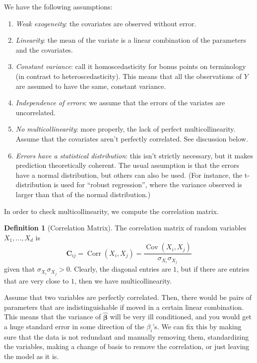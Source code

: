 \documentclass{article}
\DeclareMathOperator{\Cov}{Cov}
\DeclareMathOperator{\Corr}{Corr}
\theoremstyle{definition}
\newtheorem{definition}{Definition}[section]
\begin{document}
  We have the following assumptions: 
  \begin{enumerate}
    \item \textit{Weak exogeneity}: the covariates are observed without error.
    \item \textit{Linearity}: the mean of the variate is a linear combination of the parameters and the covariates.
    \item \textit{Constant variance}: call it homoscedasticity for bonus points on terminology (in contrast to heteroscedasticity).
    This means that all the observations of $Y$ are assumed to have the same, constant variance.
    \item \textit{Independence of errors}: we assume that the errors of the variates are uncorrelated.
    \item \textit{No multicollinearity}: more properly, the lack of perfect multicollinearity. Assume that the covariates aren't perfectly correlated. See discussion below.
    \item \textit{Errors have a statistical distribution}: this isn't strictly necessary, but it makes prediction theoretically coherent. The usual assumption is that the errors have a normal distribution, but others can also be used.
    (For instance, the t-distribution is used for ``robust regression'', where the variance observed is larger than that of the normal distribution.)
  \end{enumerate}

  In order to check multicollinearity, we compute the correlation matrix. 

  \begin{definition}[Correlation Matrix]
  The correlation matrix of random variables $X_1, \ldots, X_d$ is 
  \[\mathbf{C}_{ij} = \Corr(X_i, X_j) = \frac{\Cov(X_i, X_j)}{\sigma_{X_i} \sigma_{X_j}}\]
  given that $\sigma_{X_i} \sigma_{X_j} > 0$. Clearly, the diagonal entries are $1$, but if there are entries that are very close to $1$, then we have multicollinearity. 
  \end{definition}

  Assume that two variables are perfectly correlated. Then, there would be pairs of parameters that are indistinguishable if moved in a certain linear combination. This means that the variance of $\hat{\boldsymbol{\beta}}$ will be very ill conditioned, and you would get a huge standard error in some direction of the $\beta_i$'s. We can fix this by making sure that the data is not redundant and manually removing them, standardizing the variables, making a change of basis to remove the correlation, or just leaving the model as it is. 
\end{document}
